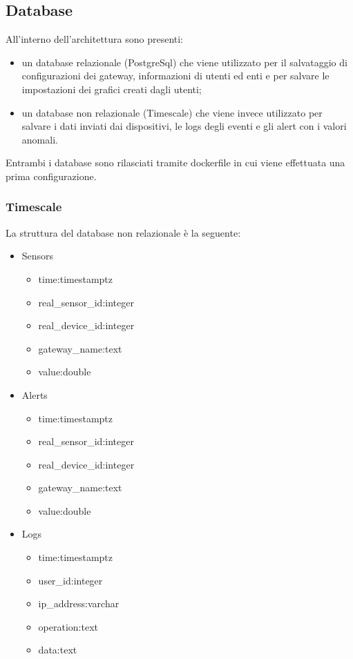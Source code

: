 \subsection{Database}
	All'interno dell'architettura sono presenti:
\begin{itemize}
	\item un database relazionale (PostgreSql) che viene utilizzato per il salvataggio di configurazioni dei gateway, informazioni di utenti ed enti e per salvare le impostazioni dei grafici creati dagli utenti;
	\item un database non relazionale (Timescale) che viene invece utilizzato per salvare i dati inviati dai dispositivi, le logs degli eventi e gli alert con i valori anomali. 
\end{itemize}
Entrambi i database sono rilasciati tramite dockerfile in cui viene effettuata una prima configurazione.
\subsubsection{Timescale}
La struttura del database non relazionale è la seguente:
\begin{itemize}
	\item Sensors
	\begin{itemize}
		\item time:timestamptz
		\item real\_sensor\_id:integer
		\item real\_device\_id:integer
		\item gateway\_name:text
		\item value:double
	\end{itemize}
	\item Alerts
	\begin{itemize}
		\item time:timestamptz
		\item real\_sensor\_id:integer
		\item real\_device\_id:integer
		\item gateway\_name:text
		\item value:double
	\end{itemize}
	\item Logs
	\begin{itemize}
		\item time:timestamptz
		\item user\_id:integer
		\item ip\_address:varchar
		\item operation:text
		\item data:text
	\end{itemize}
\end{itemize}
